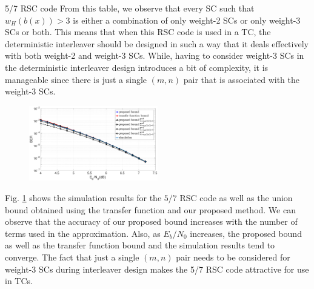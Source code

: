 \begin{example} {5/7 RSC code}
From this table, we observe that every SC such that $w_H(b(x)) >3$ is either a combination of only weight-2 SCs or only weight-3 SCs or both. This means that when this RSC code is used in a TC, the deterministic interleaver should be designed in such a way that it deals effectively with both weight-2 and weight-3 SCs. While, having to consider weight-3 SCs in the deterministic interleaver design introduces a bit of complexity, it is manageable since there is just a single $(m,n)$ pair that is associated with the weight-3 SCs.

\begin{figure}[htbp]
	\centering
	\includegraphics[width=0.5\textwidth]{./Images/RSC_5_7_lower_weights2.eps}
	\label{simFig1}
\end{figure}

Fig. \ref{simFig1} shows the simulation results for the $5/7$ RSC code as well as the union bound obtained using the transfer function and our proposed method. We can observe that the accuracy of our proposed bound increases with the number of terms used in the approximation. Also, as $E_b/N_0$ increases, the proposed bound as well as the transfer function bound and the simulation results tend to converge. The fact that just a single $(m,n)$ pair needs to be considered for weight-3 SCs during interleaver design makes the 5/7 RSC code attractive for use in TCs.
\label{ex-6}
\end{example}

